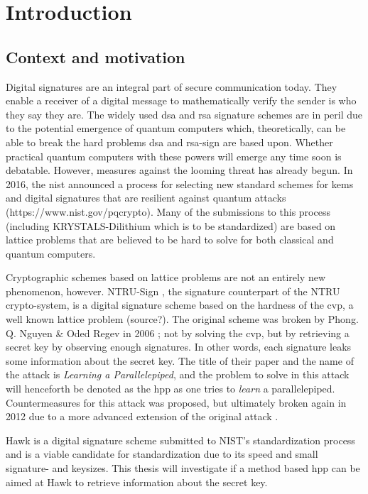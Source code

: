 \chapter{Introduction}
\section{Context and motivation}
Digital signatures are an integral part of secure communication today. They enable a receiver of a digital message to mathematically verify the sender is who they say they are. 
The widely used \gls{dsa} and \gls{rsa} 
signature schemes are in peril due to the potential emergence of quantum computers which, 
theoretically, can be able to break the hard problems \gls{dsa} and \gls{rsa}-sign are based upon.
Whether practical quantum computers with these powers will emerge any time soon is debatable. However, measures against the looming threat has already begun. 
In 2016, the \gls{nist} announced a process for selecting new standard schemes for \gls{kems} and 
digital signatures that are resilient against quantum attacks (https://www.nist.gov/pqcrypto). Many of the submissions to this process (including KRYSTALS-Dilithium which is to be standardized) 
are based on lattice problems that are believed to be hard to solve for both classical and quantum computers.

Cryptographic schemes based on lattice problems are not an entirely new phenomenon, however. NTRU-Sign \cite{NTRUSign03}, the signature counterpart of the NTRU crypto-system,
is a digital signature scheme based on the hardness of the \gls{cvp}, a well known lattice problem (source?).
The original scheme was broken by Phong. Q. Nguyen \& Oded Regev in 2006 \cite{NR09}; not by solving the \gls{cvp}, but by retrieving a secret key by observing enough signatures.
In other words, each signature leaks some information about the secret key.
The title of their paper and the name of the attack is \textit{Learning a Parallelepiped}, and the problem to solve in this attack will henceforth be denoted as the \gls{hpp} as one tries to \textit{learn} a parallelepiped.
Countermeasures for this attack was proposed, but ultimately broken again in 2012 due to a more advanced extension of the original attack \cite{Zonotope12}.

Hawk \cite{HawkSpec24} is a digital signature scheme submitted to NIST's standardization process and is a viable candidate for standardization
due to its speed and small signature- and keysizes. This thesis will investigate if a method based \gls{hpp} can be aimed at
Hawk to retrieve information about the secret key.

